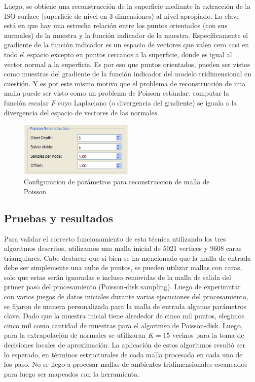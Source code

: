Luego, se obtiene una reconstrucción de la superficie mediante la extracción de la ISO-surface (superficie de nivel en 3 dimensiones) al nivel apropiado.
La clave está en que hay una estrecha relación entre los puntos orientados (con sus normales) de la muestra y la función indicador de la muestra. Específicamente el gradiente de la función indicador es un espacio de vectores que valen cero casi en todo el espacio excepto en puntos cercanos a la superficie, donde es igual al vector normal a la superficie.
Es por eso que puntos orientados, pueden ser vistos como muestras del gradiente de la función indicador del modelo tridimensional en cuestión. Y es por este mismo motivo que el problema de reconstrucción de una malla puede ser visto como un problema de Poisson estándar: computar la función escalar $F$ cuyo Laplaciano (o divergencia del gradiente) se iguala a la divergencia del espacio de vectores de las normales.

\begin{figure}[H]
  \centering
    \includegraphics[width=0.5\textwidth]{./Cap6_reconstruccion/malla-poissonreconstruction.png}
  \caption{Configuracion de parámetros para reconstruccion de malla de Poisson}
  \label{fig:Mesh-Normals}
\end{figure}

\subsection{Pruebas y resultados}

Para validar el correcto funcionamiento de esta técnica utilizando los tres algoritmos descritos, utilizamos una malla inicial de 5021 vertices y 9608 caras triangulares. Cabe destacar que si bien se ha mencionado que la malla de entrada debe ser simplemente una nube de puntos, se pueden utilizar mallas con caras, solo que estas serán ignoradas e incluso removidas de la malla de salida del primer paso del procesamiento (Poisson-disk sampling).
Luego de experimntar con varios juegos de datos iniciales durante varias ejecuciones del procesamiento, se fijaron de manera personalizada para la malla de entrada algunos parámetros clave. Dado que la muestra inicial tiene alrededor de cinco mil puntos, elegimos cinco mil como cantidad de muestras para el algorimso de Poisson-disk. Luego, para la extrapolación de normales se utilizaran $K=15$ vecinos para la toma de decisiones locales de aproximación. 
La aplicación de estos algoritmos resultó ser lo esperado, en términos estructurales de cada malla procesada en cada uno de los paso. No se llego a procesar mallas de ambientes tridimensionales escaneados para luego ser mapeados con la herramienta.


